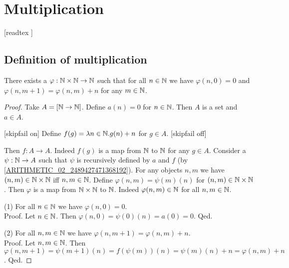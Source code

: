 \documentclass[../arithmetic.tex]{subfiles}
\begin{document}
  \chapter{Multiplication}\label{chapter:multiplication}


  \begin{forthel}

    [readtex ]

  \end{forthel}


  \section{Definition of multiplication}

  \begin{forthel}
    \begin{lemma}
      There exists a $\varphi : \mathbb{N} \times \mathbb{N} \to \mathbb{N}$ such
      that for all $n \in \mathbb{N}$ we have $\varphi(n, 0) = 0$ and
      $\varphi(n, m \plus 1) = \varphi(n,m) \plus n$ for any $m \in \mathbb{N}$.
    \end{lemma}
    \begin{proof}
      Take $A = [\mathbb{N}\to\mathbb{N}]$.
      Define $a(n) = 0$ for $n \in \mathbb{N}$.
      Then $A$ is a set and $a \in A$.

      [skipfail on] %
      Define $f(g) = \mathrm{\lambda} n \in \mathbb{N}. g(n) + n$ for $g \in A$.
      [skipfail off]

      Then $f : A \to A$.
      Indeed $f(g)$ is a map from $\mathbb{N}$ to $\mathbb{N}$ for any $g \in A$.
      Consider a $\psi : \mathbb{N} \to A$ such that $\psi$ is recursively defined by
      $a$ and $f$ (by \cref{ARITHMETIC_02_2489427471368192}).
      For any objects $n, m$ we have $(n,m) \in \mathbb{N} \times \mathbb{N}$ iff
      $n, m \in \mathbb{N}$.
      Define $\varphi(n,m) = \psi(m)(n)$ for $(n,m) \in \mathbb{N} \times \mathbb{N}$.
      Then $\varphi$ is a map from $\mathbb{N} \times \mathbb{N}$ to $\mathbb{N}$.
      Indeed $\varphi(n,m) \in \mathbb{N}$ for all $n, m \in \mathbb{N}$.

      (1) For all $n \in \mathbb{N}$ we have $\varphi(n,0) = 0$. \\
      Proof.
        Let $n \in \mathbb{N}$.
        Then $\varphi(n,0)
          = \psi(0)(n)
          = a(0)
          = 0$.
      Qed.

      (2) For all $n, m \in \mathbb{N}$ we have $\varphi(n, m \plus 1) =
      \varphi(n,m) \plus n$. \\
      Proof.
        Let $n, m \in \mathbb{N}$.
        Then $\varphi(n, m \plus 1)
          = \psi(m \plus 1)(n)
          = f(\psi(m))(n)
          = \psi(m)(n) \plus n
          = \varphi(n,m) \plus n$.
      Qed.
    \end{proof}
  \end{forthel}
\end{document}
